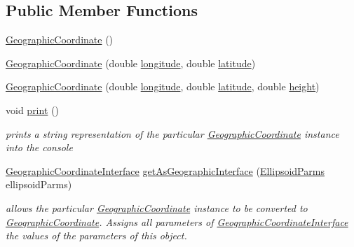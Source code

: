 \subsection*{Public Member Functions}
\begin{DoxyCompactItemize}
\item 
\hyperlink{classcoordinates_1_1_geographic_coordinate_a418ad8644fdc6d927a1eb8d57aeac922}{Geographic\+Coordinate} ()
\item 
\hyperlink{classcoordinates_1_1_geographic_coordinate_ae6e385071fe5663e16b344571b0131d0}{Geographic\+Coordinate} (double \hyperlink{classcoordinates_1_1_geographic_coordinate_a1ffbbfc5c01ab766af1d32bcc8cb42ad}{longitude}, double \hyperlink{classcoordinates_1_1_geographic_coordinate_a07a18abcc3cd691d4d8821a875dabbd6}{latitude})
\item 
\hyperlink{classcoordinates_1_1_geographic_coordinate_a41a98dc4f0a463d9b1584856da4ca9d0}{Geographic\+Coordinate} (double \hyperlink{classcoordinates_1_1_geographic_coordinate_a1ffbbfc5c01ab766af1d32bcc8cb42ad}{longitude}, double \hyperlink{classcoordinates_1_1_geographic_coordinate_a07a18abcc3cd691d4d8821a875dabbd6}{latitude}, double \hyperlink{classcoordinates_1_1_geographic_coordinate_a928334b65b117d99cd724d2c0b9b7ee0}{height})
\item 
void \hyperlink{classcoordinates_1_1_geographic_coordinate_a1cbf537f61d51979a831b2f018d28897}{print} ()
\begin{DoxyCompactList}\small\item\em prints a string representation of the particular \hyperlink{classcoordinates_1_1_geographic_coordinate}{Geographic\+Coordinate} instance into the console \end{DoxyCompactList}\item 
\hyperlink{classcoordinates_1_1_geographic_coordinate_interface}{Geographic\+Coordinate\+Interface} \hyperlink{classcoordinates_1_1_geographic_coordinate_ae316c889f13670bd69d621858495e2f3}{get\+As\+Geographic\+Interface} (\hyperlink{classparams_1_1_ellipsoid_parms}{Ellipsoid\+Parms} ellipsoid\+Parms)
\begin{DoxyCompactList}\small\item\em allows the particular \hyperlink{classcoordinates_1_1_geographic_coordinate}{Geographic\+Coordinate} instance to be converted to \hyperlink{classcoordinates_1_1_geographic_coordinate}{Geographic\+Coordinate}. Assigns all parameters of \hyperlink{classcoordinates_1_1_geographic_coordinate_interface}{Geographic\+Coordinate\+Interface} the values of the parameters of this object. \end{DoxyCompactList}\item 

\end{DoxyCompactItemize}
